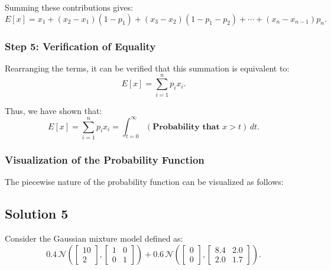 \documentclass[12pt]{article}
\begin{document}
Summing these contributions gives:
\[
E[x] = x_1 + (x_2 - x_1)(1 - p_1) + (x_3 - x_2)(1 - p_1 - p_2) + \cdots + (x_n - x_{n-1})p_n.
\]

\subsubsection*{Step 5: Verification of Equality}
Rearranging the terms, it can be verified that this summation is equivalent to:
\[
E[x] = \sum_{i=1}^n p_i x_i.
\]

Thus, we have shown that:
\[
E[x] = \sum_{i=1}^n p_i x_i = \int_{t=0}^\infty (\textbf{Probability that } x > t) \, dt.
\]

\subsubsection*{Visualization of the Probability Function}
The piecewise nature of the probability function can be visualized as follows:

\begin{center}
\end{center}



\subsection*{Solution 5}

Consider the Gaussian mixture model defined as:
\[
0.4 \, \mathcal{N} \left( \begin{bmatrix} 10 \\ 2 \end{bmatrix}, \begin{bmatrix} 1 & 0 \\ 0 & 1 \end{bmatrix} \right) + 0.6 \, \mathcal{N} \left( \begin{bmatrix} 0 \\ 0 \end{bmatrix}, \begin{bmatrix} 8.4 & 2.0 \\ 2.0 & 1.7 \end{bmatrix} \right).
\]
\end{document}
